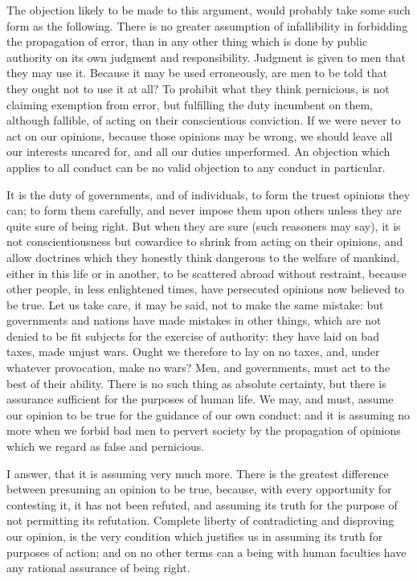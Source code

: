 \documentclass[12pt]{report}
\begin{document}
The objection likely to be made to this argument, would probably take some such form as the following. There is no greater assumption of infallibility in forbidding the propagation of error, than in any other thing which is done by public authority on its own judgment and responsibility. Judgment is given to men that they may use it. Because it may be used erroneously, are men to be told that they ought not to use it at all? To prohibit what they think pernicious, is not claiming exemption from error, but fulfilling the duty incumbent on them, although fallible, of acting on their conscientious conviction. If we were never to act on our opinions, because those opinions may be wrong, we should leave all our interests uncared for, and all our duties unperformed. An objection which applies to all conduct can be no valid objection to any conduct in particular.

It is the duty of governments, and of individuals, to form the truest opinions they can; to form them carefully, and never impose them upon others unless they are quite sure of being right. But when they are sure (such reasoners may say), it is not conscientiousness but cowardice to shrink from acting on their opinions, and allow doctrines which they honestly think dangerous to the welfare of mankind, either in this life or in another, to be scattered abroad without restraint, because other people, in less enlightened times, have persecuted opinions now believed to be true. Let us take care, it may be said, not to make the same mistake: but governments and nations have made mistakes in other things, which are not denied to be fit subjects for the exercise of authority: they have laid on bad taxes, made unjust wars. Ought we therefore to lay on no taxes, and, under whatever provocation, make no wars? Men, and governments, must act to the best of their ability. There is no such thing as absolute certainty, but there is assurance sufficient for the purposes of human life. We may, and must, assume our opinion to be true for the guidance of our own conduct: and it is assuming no more when we forbid bad men to pervert society by the propagation of opinions which we regard as false and pernicious.

I answer, that it is assuming very much more. There is the greatest difference between presuming an opinion to be true, because, with every opportunity for contesting it, it has not been refuted, and assuming its truth for the purpose of not permitting its refutation. Complete liberty of contradicting and disproving our opinion, is the very condition which justifies us in assuming its truth for purposes of action; and on no other terms can a being with human faculties have any rational assurance of being right.
\end{document}
